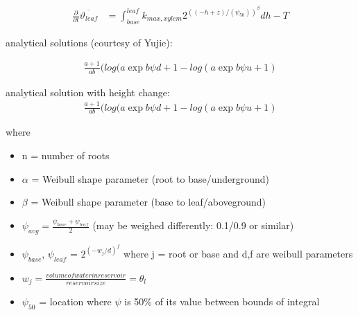 \documentclass[twoside,10pt]{report}
\begin{document}
\begin{equation*}
    \begin{aligned}
    \frac{\partial}{\partial t}\overline{\vartheta_{leaf}} &=  \int_{base}^{leaf} k_{max,xylem}2^{((-h+z) /(\psi_{50}))^\beta}dh - T
    \end{aligned}
\end{equation*}

analytical solutions (courtesy of Yujie):

\begin{equation*}
    \begin{aligned}
    \frac{a+1}{ab} (log(a \exp{b \psi{d} + 1} - log(a \exp{b \psi{u} + 1})
    \end{aligned}
\end{equation*}

analytical solution with height change:
\begin{equation*}
    \begin{aligned}
    \frac{a+1}{ab} (log(a \exp{b \psi{d} + 1} - log(a \exp{b \psi{u} + 1})
    \end{aligned}
\end{equation*}


where \\

\begin{itemize}
    \item n = number of roots
    \item $\alpha$ = Weibull shape parameter (root to base/underground) %
    \item $\beta$ = Weibull shape parameter (base to leaf/aboveground)
    \item $\psi_{avg} = \frac{\psi_{base} + \psi_{leaf}}{2}$ (may be weighed differently: 0.1/0.9 or similar)
    \item $\psi_{base}$, $\psi_{leaf}$ = $2^{(-w_{j}/d)^f}$ where j = root or base and d,f are weibull parameters
    \item $w_{j} = \frac{volume of water in reservoir}{reservoir size} = \theta_l$
    \item $\psi_{50}$ = location where $\psi$ is 50\% of its value between bounds of integral
\end{itemize}
\end{document}
